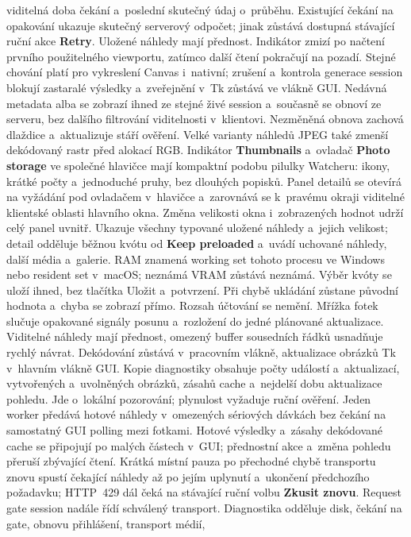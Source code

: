\documentclass[11pt,a4paper]{article}
\newcommand{\ui}[1]{\textbf{#1}}
\begin{document}
viditelná doba čekání a~poslední skutečný údaj o~průběhu. Existující čekání na
opakování ukazuje skutečný serverový odpočet; jinak zůstává dostupná stávající
ruční akce \ui{Retry}. Uložené náhledy mají přednost. Indikátor zmizí po načtení
prvního použitelného viewportu, zatímco další čtení pokračují na pozadí. Stejné
chování platí pro vykreslení Canvas i~nativní; zrušení a~kontrola generace
session blokují zastaralé výsledky a~zveřejnění v~Tk zůstává ve vlákně GUI.
Nedávná metadata alba se zobrazí ihned ze stejné živé session a~současně se
obnoví ze serveru, bez dalšího filtrování viditelnosti v~klientovi. Nezměněná
obnova zachová dlaždice a~aktualizuje stáří ověření. Velké varianty náhledů JPEG
také zmenší dekódovaný rastr před alokací RGB.
Indikátor \ui{Thumbnails} a~ovladač \ui{Photo storage} ve společné hlavičce
mají kompaktní podobu pilulky Watcheru: ikony, krátké počty a~jednoduché pruhy,
bez dlouhých popisků. Panel detailů se otevírá na vyžádání pod ovladačem
v~hlavičce a~zarovnává se k~pravému okraji viditelné klientské oblasti hlavního
okna. Změna velikosti okna i~zobrazených hodnot udrží celý panel uvnitř.
Ukazuje všechny typované uložené náhledy a~jejich velikost; detail odděluje
běžnou kvótu od \ui{Keep preloaded} a~uvádí uchované náhledy, další média
a~galerie. RAM znamená working set tohoto procesu ve Windows nebo resident set
v~macOS; neznámá VRAM zůstává neznámá. Výběr kvóty se uloží ihned, bez tlačítka
Uložit a~potvrzení. Při chybě ukládání zůstane původní hodnota a~chyba se
zobrazí přímo. Rozsah účtování se nemění.
Mřížka fotek slučuje opakované signály posunu a~rozložení do jedné plánované
aktualizace. Viditelné náhledy mají přednost, omezený buffer sousedních řádků
usnadňuje rychlý návrat. Dekódování zůstává v~pracovním vlákně, aktualizace
obrázků Tk v~hlavním vlákně GUI. Kopie diagnostiky obsahuje počty událostí
a~aktualizací, vytvořených a~uvolněných obrázků, zásahů cache a~nejdelší dobu
aktualizace pohledu. Jde o~lokální pozorování; plynulost vyžaduje ruční ověření.
Jeden worker předává hotové náhledy v~omezených sériových dávkách bez čekání
na samostatný GUI polling mezi fotkami. Hotové výsledky a~zásahy dekódované
cache se připojují po malých částech v~GUI; přednostní akce a~změna pohledu
přeruší zbývající čtení. Krátká místní pauza po přechodné chybě transportu
znovu spustí čekající náhledy až po jejím uplynutí a~ukončení předchozího
požadavku; HTTP~429 dál čeká na stávající ruční volbu \ui{Zkusit znovu}. Request gate
session nadále řídí schválený transport.
Diagnostika odděluje disk, čekání na gate, obnovu přihlášení, transport médií,
\end{document}
